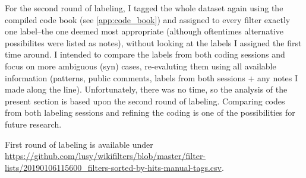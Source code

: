 For the second round of labeling, I tagged the whole dataset again using the compiled code book (see \ref{app:code_book}) and assigned to every filter exactly one label–the one deemed most appropriate (although oftentimes alternative possibilites were listed as notes), without looking at the labels I assigned the first time around.
I intended to compare the labels from both coding sessions and focus on more ambiguous (syn) cases, re-evaluting them using all available information (patterns, public comments, labels from both sessions + any notes I made along the line).
Unfortunately, there was no time, so the analysis of the present section is based upon the second round of labeling.
Comparing codes from both labeling sessions and refining the coding is one of the possibilities for future research. %

First round of labeling is available under \url{https://github.com/lusy/wikifilters/blob/master/filter-lists/20190106115600_filters-sorted-by-hits-manual-tags.csv}.

